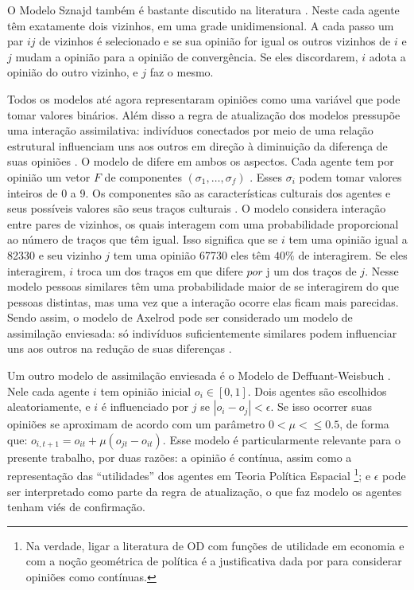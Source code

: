   O Modelo Sznajd também é bastante discutido na literatura
  \cite{sznajd2000opinion, sirbu2017opinion,castellano2012social}. Neste cada
  agente têm exatamente dois vizinhos, em uma grade unidimensional. A cada passo
  um par $ij$ de vizinhos é selecionado e se sua opinião for igual os outros
  vizinhos de \(i\) e \(j\) mudam a opinião para a opinião de convergência. Se
  eles discordarem, \(i\) adota a opinião do outro vizinho, e \(j\) faz o mesmo.

  Todos os modelos até agora representaram opiniões como uma variável que pode
  tomar valores binários. Além disso a regra de atualização dos modelos
  pressupõe uma interação assimilativa: indivíduos conectados por meio de uma
  relação estrutural influenciam uns aos outros em direção à diminuição da
  diferença de suas opiniões \cite{flache2017}. O modelo de
   difere em ambos os aspectos. Cada agente
  tem por opinião um vetor $F$ de componentes $(\sigma_1 , \ldots, \sigma_f)$
  \cite{klemm2003role}. Esses $\sigma_i$ podem tomar valores inteiros de 0 a 9. Os
  componentes são as características culturais dos agentes e seus possíveis
  valores são seus traços culturais \cite{gomes2014}. O modelo considera
  interação entre pares de vizinhos, os quais interagem com uma probabilidade
  proporcional ao número de traços que têm igual. Isso significa que se \(i\)
  tem uma opinião igual a 82330 e seu vizinho \(j\) tem uma opinião 67730 eles
  têm \(40 \%\) de interagirem. Se eles interagirem, \(i\) troca um dos traços
  em que difere \(por\) j um dos traços de
  \(j\)\cite{axelrod1997dissemination}. Nesse modelo pessoas similares
  têm uma probabilidade maior de se interagirem do que pessoas distintas, mas
  uma vez que a interação ocorre elas ficam mais parecidas. Sendo assim, o
  modelo de Axelrod pode ser considerado um modelo de assimilação enviesada: só
  indivíduos suficientemente similares podem influenciar uns aos outros na
  redução de suas diferenças \cite{flache2017}.


  Um outro modelo de assimilação enviesada é o Modelo de Deffuant-Weisbuch
  \cite{deffuant2000mixing}. Nele cada agente \(i\) tem opinião inicial \( o_i \in
  [0,1]\). Dois agentes são escolhidos aleatoriamente, e \(i\) é influenciado
  por \(j\) se \(| o_i - o_j| < \epsilon\). Se isso ocorrer suas opiniões se aproximam
  de acordo com um parâmetro $0 < \mu< \leq 0.5$, de forma que: $o_{i,t+1} = o_{it} +
  \mu(o_{jt} - o_{it})$. Esse modelo é particularmente relevante para o presente
  trabalho, por duas razões: a opinião é contínua, assim como a representação
  das ``utilidades'' dos agentes em Teoria Política Espacial \footnote{Na
    verdade, ligar a literatura de OD com funções de utilidade em economia e com
    a noção geométrica de política é a justificativa dada por
     para considerar opiniões como contínuas.}; e
  \(\epsilon\) pode ser interpretado como parte da regra de atualização, o que faz
  modelo os agentes tenham viés de confirmação.


